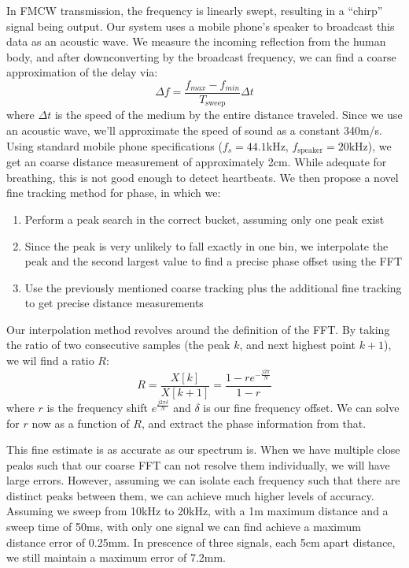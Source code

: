 In FMCW transmission, the frequency is linearly swept, resulting in a “chirp” signal being output. Our system uses a mobile phone’s speaker to broadcast this data as an acoustic wave. We measure the incoming reflection from the human body, and after downconverting by the broadcast frequency, we can find a coarse approximation of the delay via:
$$ \Delta f = \dfrac{f_{max} - f_{min}}{T_{\mathrm{sweep}}} \Delta t$$
where $\Delta t$ is the speed of the medium by the entire distance traveled. Since we use an acoustic wave, we'll approximate the speed of sound as a constant 340m/s. Using standard mobile phone specifications ($f_{s} = 44.1$kHz, $f_{\mathrm{speaker}} = 20$kHz), we get an coarse distance measurement of approximately 2cm. While adequate for breathing, this is not good enough to detect heartbeats. We then propose a novel fine tracking method for phase, in which we:
\begin{enumerate}
 	\item Perform a peak search in the correct bucket, assuming only one peak exist
 	\item Since the peak is very unlikely to fall exactly in one bin, we interpolate the peak and the second largest value to find a precise phase offset using the FFT
 	\item Use the previously mentioned coarse tracking plus the additional fine tracking to get precise distance measurements
\end{enumerate} 
Our interpolation method revolves around the definition of the FFT. By taking the ratio of two consecutive samples (the peak $k$, and next highest point $k+1$), we wil find a ratio $R$:
$$ R = \dfrac{X[k]}{X[k+1]} = \dfrac{1 - r e^{-\frac{j2\pi}{N}}}{1 -r}$$
where $r$ is the frequency shift $e^{\frac{j2\pi\delta}{N}}$ and $\delta$ is our fine frequency offset. We can solve for $r$ now as a function of $R$, and extract the phase information from that.

This fine estimate is as accurate as our spectrum is. When we have multiple close peaks such that our coarse FFT can not resolve them individually, we will have large errors. However, assuming we can isolate each frequency such that there are distinct peaks between them, we can achieve much higher levels of accuracy. Assuming we sweep from 10kHz to 20kHz, with a 1m maximum distance and a sweep time of 50ms, with only one signal we can find achieve a maximum distance error of 0.25mm. In prescence of three signals, each 5cm apart distance, we still maintain a maximum error of 7.2mm.
